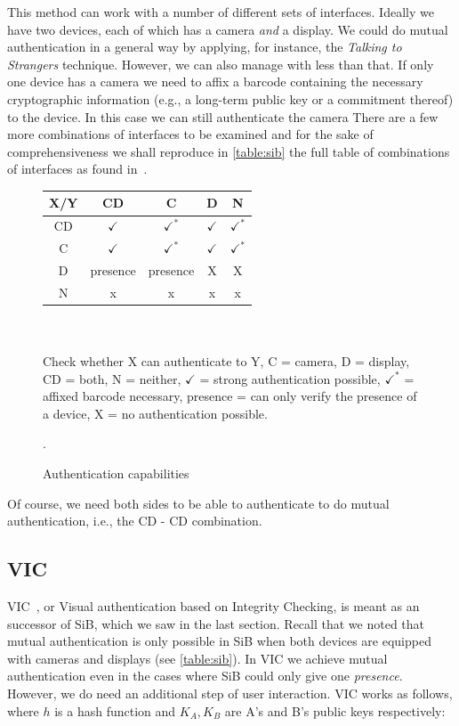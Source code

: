 \documentclass[conference, 11pt]{sty/IEEEtran}
\begin{document}
This method can work with a number of different sets of interfaces.
Ideally we have two devices, each of which has a camera \emph{and} a display.
We could do mutual authentication in a general way by applying, for instance, the \emph{Talking to Strangers} technique.
However, we can also manage with less than that.
If only one device has a camera we need to affix a barcode containing the necessary cryptographic information (e.g., a long-term public key or a commitment thereof) to the device.
In this case we can still authenticate the camera 
There are a few more combinations of interfaces to be examined and for the sake of comprehensiveness we shall reproduce in \autoref{table:sib} the full table of combinations of interfaces as found in~\cite{mccune2005seeing}.

\begin{figure}[h]
    \begin{tabular}{ c | c c c c }
      X/Y  & CD & C & D & N \\ \hline
        CD & $\checkmark$ & $\checkmark^*$ & $\checkmark$ & $\checkmark^*$ \\
        C & $\checkmark$ & $\checkmark^*$ & $\checkmark$ & $\checkmark^*$ \\
        D & presence & presence & X & X \\
        N & x & x & x & x \\
    \end{tabular}
    \\ \\
    \small{Check whether X can authenticate to Y, C = camera, D = display, CD = both, N = neither, $\checkmark$ = strong authentication possible, $\checkmark^*$ = affixed barcode necessary, presence = can only verify the presence of a device, X = no authentication possible.}
    \caption{Authentication capabilities}.
    \label{table:sib}
\end{figure}

Of course, we need both sides to be able to authenticate to do mutual authentication, i.e., the CD - CD combination.

\subsection{VIC}
\label{ssec:vic}

VIC~\cite{saxena2006secure}, or Visual authentication based on Integrity Checking, is meant as an successor of SiB, which we saw in the last section.
Recall that we noted that mutual authentication is only possible in SiB when both devices are equipped with cameras and displays (see \autoref{table:sib}).
In VIC we achieve mutual authentication even in the cases where SiB could only give one \emph{presence}.
However, we do need an additional step of user interaction.
VIC works as follows, where $h$ is a hash function and $K_A, K_B$ are A's and B's public keys respectively:
\end{document}
